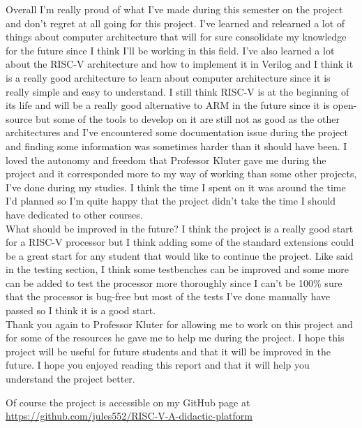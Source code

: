 Overall I'm really proud of what I've made during this semester on the project and don't regret at all going for this project.
I've learned and relearned a lot of things about computer architecture that will for sure consolidate my knowledge for the future
since I think I'll be working in this field. 
I've also learned a lot about the RISC-V architecture and how to implement it in Verilog and I think it is a really good architecture 
to learn about computer architecture since it is really simple and easy to understand.
I still think RISC-V is at the beginning of its life and will be a really good alternative to ARM in the future since it is open-source
but some of the tools to develop on it are still not as good as the other architectures and I've encountered some documentation issue 
during the project and finding some information was sometimes harder than it should have been.
I loved the autonomy and freedom that Professor Kluter gave me during the project and it corresponded more to my way of working
than some other projects, I've done during my studies. I think the time I spent on it was around the time I'd planned so I'm quite happy
that the project didn't take the time I should have dedicated to other courses.\\

What should be improved in the future?
I think the project is a really good start for a RISC-V processor but I think adding some of the standard extensions could 
be a great start for any student that would like to continue the project. Like said in the testing section, I think some testbenches 
can be improved and some more can be added to test the processor more thoroughly since I can't be 100\% sure that the processor 
is bug-free but most of the tests I've done manually have passed so I think it is a good start.\\

Thank you again to Professor Kluter for allowing me to work on this project and for some of the resources he gave me 
to help me during the project. I hope this project will be useful for future students and that it will be improved in the future.
I hope you enjoyed reading this report and that it will help you understand the project better.

Of course the project is accessible on my GitHub page at \href{https://github.com/jules552/RISC-V-A-didactic-platform}{https://github.com/jules552/RISC-V-A-didactic-platform}